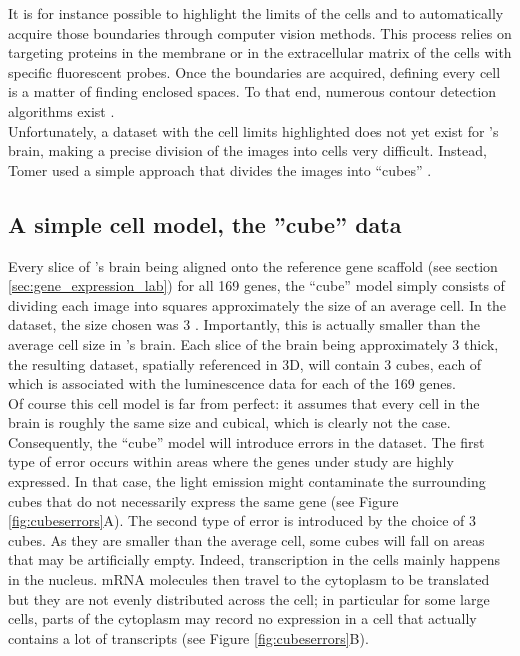   It is for instance possible to highlight the limits of the cells and to automatically acquire those boundaries through computer vision methods. This process relies on targeting proteins in the membrane or in the extracellular matrix of the cells with specific fluorescent probes. Once the boundaries are acquired, defining every cell is a matter of finding enclosed spaces. To that end, numerous contour detection algorithms exist \citep{li95,fan01,arbelaez11}.\\
  
  Unfortunately, a dataset with the cell limits highlighted does not yet exist for \platy{}'s brain, making a precise division of the images into cells very difficult. Instead, Tomer used a simple approach that divides the images into ``cubes'' \citep{Tomer10}.


  \subsection{A simple cell model, the ''cube'' data}
  
  Every slice of \platy{}'s brain being aligned onto the reference gene scaffold (see section \ref{sec:gene_expression_lab}) for all 169 genes, the ``cube'' model simply consists of dividing each image into squares approximately the size of an average cell. In the \platy{} dataset, the size chosen was 3  \citep{Fischer10}. Importantly, this is actually smaller than the average cell size in \platy{}'s brain. Each slice of the brain being approximately 3 \microm{} thick, the resulting dataset, spatially referenced in 3D, will contain 3  cubes, each of which is associated with the luminescence data for each of the 169 genes.\\
  
  Of course this cell model is far from perfect: it assumes that every cell in the brain is roughly the same size and cubical, which is clearly not the case. Consequently, the ``cube'' model will introduce errors in the dataset. The first type of error occurs within areas where the genes under study are highly expressed. In that case, the light emission might contaminate the surrounding cubes that do not necessarily express the same gene (see Figure \ref{fig:cubeserrors}A). The second type of error is introduced by the choice of 3  cubes. As they are smaller than the average cell, some cubes will fall on areas that may be artificially empty. Indeed, transcription in the cells mainly happens in the nucleus. mRNA molecules then travel to the cytoplasm to be translated but they are not evenly distributed across the cell; in particular for some large cells, parts of the cytoplasm may record no expression in a cell that actually contains a lot of transcripts (see Figure \ref{fig:cubeserrors}B).\\
  
